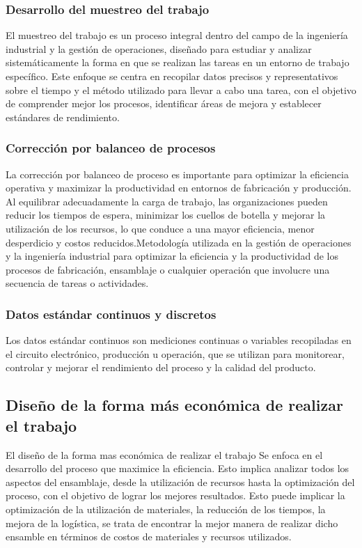     \subsubsection{Desarrollo del muestreo del trabajo}
    El muestreo del trabajo es un proceso integral dentro del campo de la ingeniería industrial y la gestión de operaciones, diseñado para estudiar y analizar sistemáticamente la forma en que se realizan las tareas en un entorno de trabajo específico. Este enfoque se centra en recopilar datos precisos y representativos sobre el tiempo y el método utilizado para llevar a cabo una tarea, con el objetivo de comprender mejor los procesos, identificar áreas de mejora y establecer estándares de rendimiento.
    \subsubsection{Corrección por balanceo de procesos}
     La corrección por balanceo de proceso es importante  para optimizar la eficiencia operativa y maximizar la productividad en entornos de fabricación y producción. Al equilibrar adecuadamente la carga de trabajo, las organizaciones pueden reducir los tiempos de espera, minimizar los cuellos de botella y mejorar la utilización de los recursos, lo que conduce a una mayor eficiencia, menor desperdicio y costos reducidos.Metodología utilizada en la gestión de operaciones y la ingeniería industrial para optimizar la eficiencia y la productividad de los procesos de fabricación, ensamblaje o cualquier operación que involucre una secuencia de tareas o actividades.
    \subsubsection{Datos estándar continuos y discretos}
    Los datos estándar continuos son mediciones continuas o variables recopiladas en el circuito electrónico, producción u operación, que se utilizan para monitorear, controlar y mejorar el rendimiento del proceso y la calidad del producto.
    \subsection{Diseño de la forma más económica de realizar el trabajo}
     El diseño de la forma mas económica de realizar el trabajo Se enfoca en el  desarrollo del  proceso que maximice la eficiencia. Esto implica analizar todos los aspectos del ensamblaje, desde la utilización de recursos hasta la optimización del  proceso, con el objetivo de lograr los mejores resultados. Esto puede implicar la optimización de la utilización de materiales, la reducción de los tiempos, la mejora de la logística, se trata de encontrar la mejor manera de realizar dicho ensamble en términos de costos de materiales y recursos utilizados.
    
